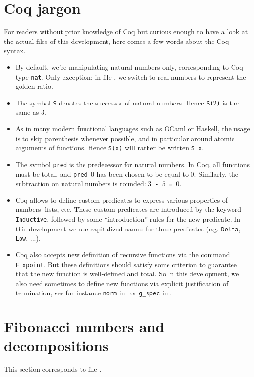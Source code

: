 \documentclass[a4paper,11pt]{article}
\begin{document}
\section{Coq jargon}
For readers without prior knowledge
of Coq but curious enough to have a look at the actual files
of this development, here comes a few words about the Coq syntax.
\begin{itemize}
\item By default, we're manipulating natural numbers only, corresponding
 to Coq type {\tt nat}. Only exception: in file ,
 we switch to real numbers to represent the golden ratio.
\item The symbol {\tt S} denotes the successor of natural numbers.
  Hence {\tt S($2$)} is the same as $3$.
\item As in many modern functional languages such as OCaml or Haskell,
  the usage is to skip parenthesis whenever possible, and
  in particular around atomic arguments of functions. Hence
  {\tt S(x)} will rather be written {\tt S x}.
\item The symbol {\tt pred} is the predecessor for natural numbers.
  In Coq, all functions must be total, and {\tt pred $0$} has been
  chosen to be equal to $0$. Similarly, the subtraction on
  natural numbers is rounded: {\tt $3$ - $5$ = $0$}.
\item Coq allows to define custom predicates to express various
  properties of numbers, lists, etc. These custom predicates are
  introduced by the keyword {\tt Inductive}, followed by some
  ``introduction'' rules for the new predicate. In this development
  we use capitalized names for these predicates (e.g. {\tt Delta},
  {\tt Low}, ...).
\item Coq also accepts new definition of recursive functions via
  the command {\tt Fixpoint}. But these definitions should satisfy
  some criterion to guarantee that the new function is well-defined
  and total. So in this development, we also need sometimes to
  define new functions via explicit justification of termination,
  see for instance {\tt norm} in \ or {\tt g\_spec} in
  .
\end{itemize}

\section{Fibonacci numbers and decompositions}

This section corresponds to file .
\end{document}
